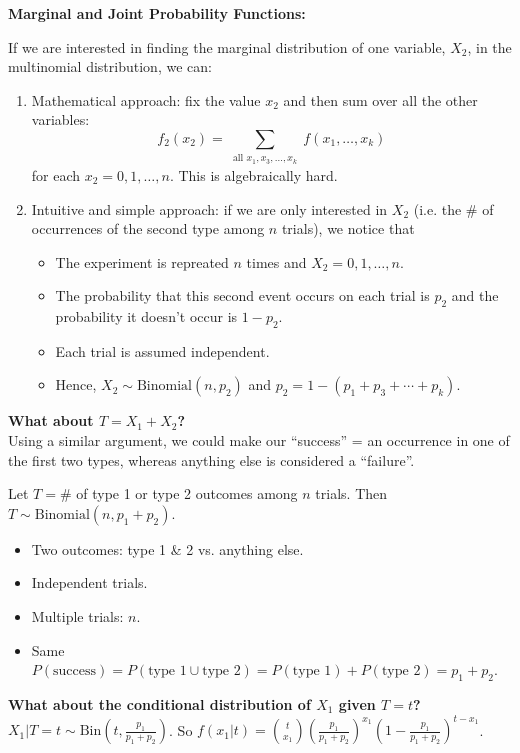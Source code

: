 \pagebreak

\textbf{Marginal and Joint Probability Functions:}

If we are interested in finding the marginal distribution of one variable, $X_2$, in the multinomial distribution, we can:

\begin{enumerate}
    \item Mathematical approach: fix the value $x_2$ and then sum over all the other variables:
    \[
        f_2(x_2) = \displaystyle \sum_{\substack{\text{all }x_1,x_3,\ldots ,x_k}} f(x_1,\ldots ,x_k)
    \]
    for each $x_2 = 0,1,\ldots , n$. This is algebraically hard.

    \item Intuitive and simple approach: if we are only interested in $X_2$ (i.e. the $\#$ of occurrences of the second type among $n$ trials), we notice that
    \begin{itemize}
        \item The experiment is repreated $n$ times and $X_2 = 0,1,\ldots ,n$.
        \item The probability that this second event occurs on each trial is $p_2$ and the probability it doesn't occur is $1-p_2$.
        \item Each trial is assumed independent.
        \item Hence, $X_2 \sim \text{Binomial}(n,p_2)$ and $p_2 = 1 - (p_1 + p_3 + \cdots + p_k)$.
    \end{itemize}
\end{enumerate}

\textbf{What about $T = X_1 + X_2$?} \\
Using a similar argument, we could make our ``success'' =  an occurrence in one of the first two types, whereas anything else is considered a ``failure''.

Let $T = \#$ of type 1 or type 2 outcomes among $n$ trials. Then $T \sim \text{Binomial}(n,p_1 + p_2)$.
\begin{itemize}
    \item Two outcomes: type 1 \& 2 vs. anything else.
    \item Independent trials.
    \item Multiple trials: $n$.
    \item Same  $P(\text{success}) = P(\text{type 1} \cup \text{type 2}) = P(\text{type 1}) + P(\text{type 2}) = p_1 + p_2$.
\end{itemize}

\textbf{What about the conditional distribution of $X_1$ given $T = t$?} \\
$X_1 | T=t \sim \text{Bin}(t, \frac{p_1}{p_1 + p_2})$. So $f(x_1|t) = \binom{t}{x_1} \left( \frac{p_1}{p_1 + p_2} \right)^{x_1} \left( 1 - \frac{p_1}{p_1 + p_2} \right)^{t - x_1}$.


